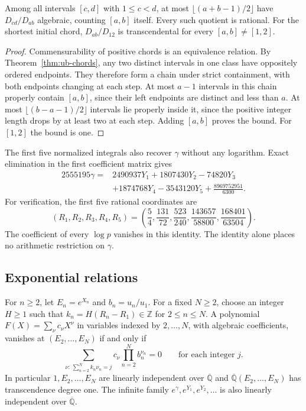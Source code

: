 \documentclass[11pt,a4paper]{article}
\theoremstyle{definition}\newtheorem{definition}[theorem]{Definition}\newtheorem{example}[theorem]{Example}
\theoremstyle{remark}\newtheorem{remark}[theorem]{Remark}
\newcommand{\Q}{\mathbb Q}\newcommand{\Z}{\mathbb Z}\newcommand{\R}{\mathbb R}\newcommand{\N}{\mathbb N}
\begin{document}
\begin{corollary}
\label{cor:ub-chordclasses}
Among all intervals $[c,d]$ with $1\le c<d$, at most
$\lfloor(a+b-1)/2\rfloor$ have $D_{cd}/D_{ab}$ algebraic, counting
$[a,b]$ itself. Every such quotient is rational. For the shortest
initial chord, $D_{ab}/D_{12}$ is transcendental for every
$[a,b]\ne[1,2]$.
\end{corollary}

\begin{proof}
Commensurability of positive chords is an equivalence relation.
By Theorem~\ref{thm:ub-chords}, any two distinct intervals in one
class have oppositely ordered endpoints. They therefore form a chain
under strict containment, with both endpoints changing at each step.
At most $a-1$ intervals in this chain properly contain $[a,b]$,
since their left endpoints are distinct and less than $a$. At most
$\lfloor(b-a-1)/2\rfloor$ intervals lie properly inside it, since
the positive integer length drops by at least two at each step.
Adding $[a,b]$ proves the bound. For $[1,2]$ the bound is one.
\end{proof}

The first five normalized integrals also recover $\gamma$ without
any logarithm. Exact elimination in the first coefficient matrix gives
\begin{align*}
 2555195\gamma={}&2490937Y_1+1807430Y_2-74820Y_3\\
                  &+1874768Y_4-3543120Y_5+\frac{8969752951}{6300}.
\end{align*}
For verification, the first five rational coordinates are
\[
 (R_1,R_2,R_3,R_4,R_5)=
 \left(\frac54,\frac{131}{72},\frac{523}{240},\frac{143657}{58800},\frac{168401}{63504}\right).
\]
The coefficient of every $\log p$ vanishes in this identity. The
identity alone places no arithmetic restriction on $\gamma$.

\subsection{Exponential relations}

\begin{proposition}
\label{prop:ub-exponentials}
For $n\ge2$, let $E_n=e^{X_n}$ and $b_n=u_n/u_1$. For a fixed
$N\ge2$, choose an integer $H\ge1$ such that
$k_n=H(R_n-R_1)\in\Z$ for $2\le n\le N$. A polynomial
$F(X)=\sum_{\nu} c_\nu X^\nu$ in variables indexed by $2,\ldots,N$,
with algebraic coefficients, vanishes at $(E_2,\ldots,E_N)$ if and
only if
\[
 \sum_{\nu:\,\sum_{n=2}^N k_n\nu_n=j}
          c_\nu\prod_{n=2}^N b_n^{\nu_n}=0
 \qquad\text{for each integer }j .
\]
In particular $1,E_2,\ldots,E_N$ are linearly independent over
$\overline{\Q}$ and
$\overline{\Q}(E_2,\ldots,E_N)$ has transcendence degree one.
The infinite family $e^\gamma,e^{Y_1},e^{Y_2},\ldots$ is also
linearly independent over $\overline{\Q}$.
\end{proposition}
\end{document}
